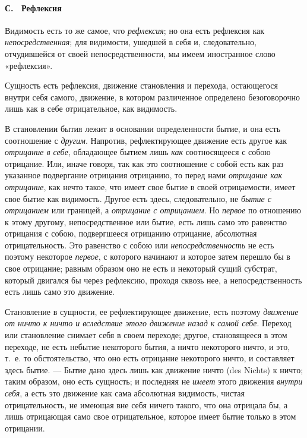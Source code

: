 \paragraph[С. \ Рефлексия]{С. \ Рефлексия}
Видимость есть то же самое, что
{\em рефлексия}; но она есть рефлексия как
{\em непосредственная}; для видимости, ушедшей в себя
и, следовательно, отчудившейся от своей непосредственности, мы имеем
иностранное слово «рефлексия».

Сущность есть рефлексия, движение становления и перехода, остающегося внутри
себя самого, движение, в котором различенное определено безоговорочно лишь
как в себе отрицательное, как видимость.

В становлении бытия лежит в основании определенности бытие, и она есть
соотношение с {\em другим}. Напротив, рефлектирующее
движение есть другое как {\em отрицание в себе},
обладающее бытием лишь {\em как} соотносящееся с собою
отрицание. Или, иначе говоря, так как это соотношение с собой есть как раз
указанное подвергание отрицания отрицанию, то перед нами
{\em отрицание как отрицание}, как нечто такое, что
имеет свое бытие в своей отрицаемости, имеет свое бытие как видимость.
Другое есть здесь, следовательно, не {\em бытие с
отрицанием} или границей, а {\em отрицание с
отрицанием}. Но {\em первое} по отношению к этому
другому, непосредственное или бытие, есть лишь само это равенство отрицания
с собою, подвергшееся отрицанию отрицание, абсолютная отрицательность. Это
равенство с собою или {\em непосредственность} не есть
поэтому некоторое {\em первое}, с которого начинают и
которое затем перешло бы в свое отрицание; равным образом оно не есть и
некоторый сущий субстрат, который двигался бы через рефлексию, проходя
сквозь нее, а непосредственность есть лишь само это движение.

Становление в сущности, ее рефлектирующее движение, есть поэтому
{\em движение от ничто к ничто и вследствие этого
движение назад к самой себе}. Переход или становление снимает себя в своем
переходе; другое, становящееся в этом переходе, не есть небытие некоторого
бытия, а ничто некоторого ничто, и это, т.~е. то обстоятельство, что оно
есть отрицание некоторого ничто, и составляет здесь бытие. — Бытие дано
здесь лишь как движение ничто (des Nichts) к ничто; таким образом, оно есть
сущность; и последняя не {\em имеет} этого движения
{\em внутри себя}, а есть это движение как сама
абсолютная видимость, чистая отрицательность, не имеющая вне себя ничего
такого, что она отрицала бы, а лишь отрицающая само свое отрицательное,
которое имеет бытие только в этом отрицании.

